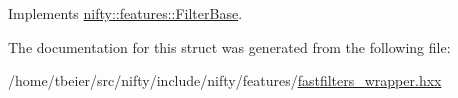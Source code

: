 Implements \hyperlink{structnifty_1_1features_1_1FilterBase_abbef4e9c260026926e0021aa0cc11c81}{nifty\+::features\+::\+Filter\+Base}.



The documentation for this struct was generated from the following file\+:\begin{DoxyCompactItemize}
\item 
/home/tbeier/src/nifty/include/nifty/features/\hyperlink{fastfilters__wrapper_8hxx}{fastfilters\+\_\+wrapper.\+hxx}\end{DoxyCompactItemize}
